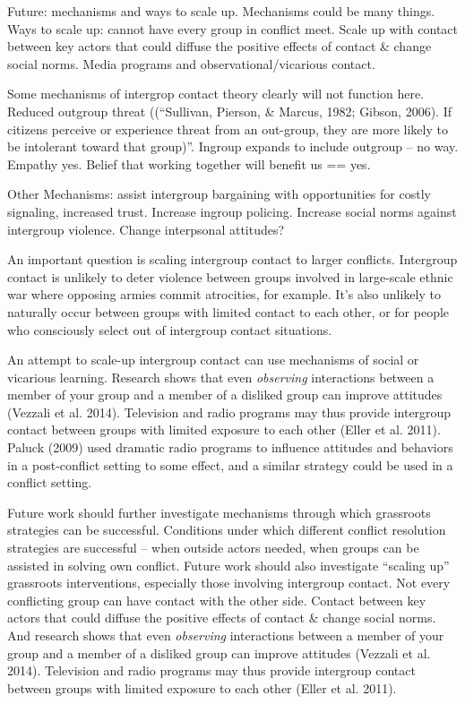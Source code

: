 \documentclass[11pt]{article}
\begin{document}
Future: mechanisms and ways to scale up. Mechanisms could be many
things. Ways to scale up: cannot have every group in conflict meet.
Scale up with contact between key actors that could diffuse the positive
effects of contact \& change social norms. Media programs and
observational/vicarious contact.

Some mechanisms of intergrop contact theory clearly will not function
here. Reduced outgroup threat ((``Sullivan, Pierson, \& Marcus, 1982;
Gibson, 2006). If citizens perceive or experience threat from an
out-group, they are more likely to be intolerant toward that group)''.
Ingroup expands to include outgroup -- no way. Empathy yes. Belief that
working together will benefit us == yes.

Other Mechanisms: assist intergroup bargaining with opportunities for
costly signaling, increased trust. Increase ingroup policing. Increase
social norms against intergroup violence. Change interpsonal attitudes?

An important question is scaling intergroup contact to larger conflicts.
Intergroup contact is unlikely to deter violence between groups involved
in large-scale ethnic war where opposing armies commit atrocities, for
example. It's also unlikely to naturally occur between groups with
limited contact to each other, or for people who consciously select out
of intergroup contact situations.

An attempt to scale-up intergroup contact can use mechanisms of social
or vicarious learning. Research shows that even \emph{observing}
interactions between a member of your group and a member of a disliked
group can improve attitudes (Vezzali et al. 2014). Television and radio
programs may thus provide intergroup contact between groups with limited
exposure to each other (Eller et al. 2011). Paluck (2009) used dramatic
radio programs to influence attitudes and behaviors in a post-conflict
setting to some effect, and a similar strategy could be used in a
conflict setting.

Future work should further investigate mechanisms through which
grassroots strategies can be successful. Conditions under which
different conflict resolution strategies are successful -- when outside
actors needed, when groups can be assisted in solving own conflict.
Future work should also investigate ``scaling up'' grassroots
interventions, especially those involving intergroup contact. Not every
conflicting group can have contact with the other side. Contact between
key actors that could diffuse the positive effects of contact \& change
social norms. And research shows that even \emph{observing} interactions
between a member of your group and a member of a disliked group can
improve attitudes (Vezzali et al. 2014). Television and radio programs
may thus provide intergroup contact between groups with limited exposure
to each other (Eller et al. 2011).
\end{document}
